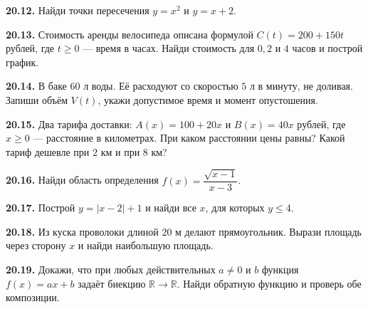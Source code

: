 \noindent\begin{minipage}[t]{\linewidth}\textbf{20.12.} Найди точки пересечения \(y = x^{2}\) и \(y = x + 2\).\par\end{minipage}\par
\noindent\begin{minipage}[t]{\linewidth}\textbf{20.13.} Стоимость аренды велосипеда описана формулой \(C (t) = 200 + 150 t\) рублей, где \(t \ge  0\) — время в часах. Найди стоимость для \(0,\allowbreak 2\) и \(4\) часов и построй график.\par\end{minipage}\par
\noindent\begin{minipage}[t]{\linewidth}\textbf{20.14.} В баке \(60\) л воды. Её расходуют со скоростью \(5\) л в минуту, не доливая. Запиши объём \(V (t)\), укажи допустимое время и момент опустошения.\par\end{minipage}\par
\noindent\begin{minipage}[t]{\linewidth}\textbf{20.15.} Два тарифа доставки: \(A (x) = 100 + 20 x\) и \(B (x) = 40 x\) рублей, где \(x \ge  0\) — расстояние в километрах. При каком расстоянии цены равны? Какой тариф дешевле при \(2\) км и при \(8\) км?\par\end{minipage}\par
\noindent\begin{minipage}[t]{\linewidth}\textbf{20.16.}\starmark{} Найди область определения \(f (x) = \dfrac{\sqrt{x - 1}}{x - 3}\).\par\end{minipage}\par
\noindent\begin{minipage}[t]{\linewidth}\textbf{20.17.}\starmark{} Построй \(y = | x - 2 | + 1\) и найди все \(x\), для которых \(y \le  4\).\par\end{minipage}\par
\noindent\begin{minipage}[t]{\linewidth}\textbf{20.18.}\starmark{} Из куска проволоки длиной \(20\) м делают прямоугольник. Вырази площадь через сторону \(x\) и найди наибольшую площадь.\par\end{minipage}\par
\noindent\begin{minipage}[t]{\linewidth}\textbf{20.19.}\starmark{} Докажи, что при любых действительных \(a\ne0\) и \(b\) функция \(f(x)=ax+b\) задаёт биекцию \(\mathbb R\to\mathbb R\). Найди обратную функцию и проверь обе композиции.\par\end{minipage}\par
